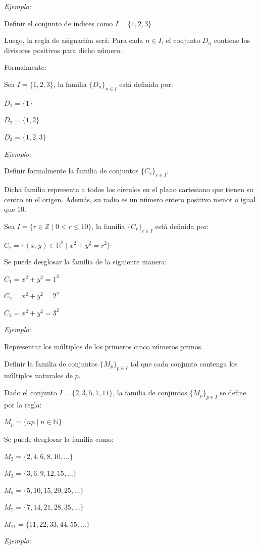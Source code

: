 \documentclass{article}
\begin{document}
\textit{Ejemplo:}

Definir el conjunto de índices como $I = \{1, 2, 3\}$

Luego, la regla de asignación será: Para cada $n \in I$, el conjunto $D_n$ contiene los divisores positivos para dicho número.

Formalmente:

Sea $I = \{1, 2, 3\}$, la familia $\{D_n\}_{n \in I}$ está definida por:

$D_1 = \{1\}$

$D_2 = \{1, 2\}$

$D_3 = \{1, 2, 3 \}$

\textit{Ejemplo:}

Definir formalmente la familia de conjuntos $\{C_r\}_{r \in I}$. 

Dicha familia representa a todos los círculos en el plano cartesiano que tienen su centro en el origen. Además, su radio es un número entero positivo menor o igual que $10$.

Sea $I = \{r \in \mathbb{Z} \mid 0 < r \le 10 \}$, la familia $\{C_r\}_{r \in I}$ está definida por:

$C_r = \{(x, y) \in \mathbb{R}^2 \mid x^2 + y^2 = r^2\}$

Se puede desglosar la familia de la siguiente manera:

$C_1 = x^2 + y^2 = 1^2$

$C_2 = x^2 + y^2 = 2^2$

$C_3 = x^2 + y^2 = 3^2$

\textit{Ejemplo:}

Representar los múltiplos de los primeros cinco números primos.

Definir la familia de conjuntos $\{M_p\}_{p \in I}$ tal que cada conjunto contenga los múltiplos naturales de $p$.

Dado el conjunto $I = \{2, 3, 5, 7, 11\}$, la familia de conjuntos $\{M_p\}_{p \in I}$ se define por la regla:

$M_p = \{np \mid n \in \mathbb{N}\}$

Se puede desglosar la familia como:

$M_2 = \{2, 4, 6, 8, 10, \dots\}$

$M_3 = \{3, 6, 9, 12, 15, \dots\}$

$M_5 = \{5, 10, 15, 20, 25, \dots\}$

$M_7 = \{7, 14, 21, 28, 35, \dots\}$

$M_{11} = \{11, 22, 33, 44, 55, \dots\}$

\textit{Ejemplo:}
\end{document}
